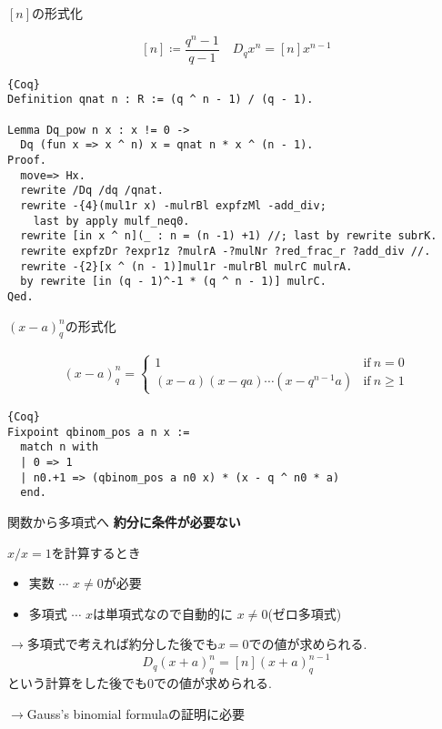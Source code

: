 \documentclass[dvipdfmx,cjk]{beamer}
\theoremstyle{mystyle}
\newcommand{\0}{\textbf{0}}
\begin{document}
\begin{frame}[fragile]{$[n]$の形式化}
	\begin{screen}
		\[
			[n] \coloneqq \frac{q^n - 1}{q - 1} \quad D_q x^n = [n] x^{n - 1}
		\]
	\end{screen}
	\begin{lstlisting}{Coq}
Definition qnat n : R := (q ^ n - 1) / (q - 1).

Lemma Dq_pow n x : x != 0 ->
  Dq (fun x => x ^ n) x = qnat n * x ^ (n - 1).
Proof.
  move=> Hx.
  rewrite /Dq /dq /qnat.
  rewrite -{4}(mul1r x) -mulrBl expfzMl -add_div;
    last by apply mulf_neq0.
  rewrite [in x ^ n](_ : n = (n -1) +1) //; last by rewrite subrK.
  rewrite expfzDr ?expr1z ?mulrA -?mulNr ?red_frac_r ?add_div //.
  rewrite -{2}[x ^ (n - 1)]mul1r -mulrBl mulrC mulrA.
  by rewrite [in (q - 1)^-1 * (q ^ n - 1)] mulrC.
Qed. \end{lstlisting}
\end{frame}

\begin{frame}[fragile]{$(x - a)^n_q$の形式化}
	\begin{screen}
		\begin{align*}
			(x - a)^n_q = \begin{cases}
	                      1 & \text{if}\ n = 0 \\
	                      (x - a) (x - qa) \cdots (x - q^{n - 1} a) & \text{if}\ n \ge 1
	                    \end{cases}
		\end{align*}
	\end{screen}
	\begin{lstlisting}{Coq}
Fixpoint qbinom_pos a n x :=
  match n with
  | 0 => 1
  | n0.+1 => (qbinom_pos a n0 x) * (x - q ^ n0 * a)
  end. \end{lstlisting}
\end{frame}

%

\begin{frame}{関数から多項式へ}
	\textbf{約分に条件が必要ない}
	
	$x / x = 1$を計算するとき
	\begin{itemize}
		\item 実数 $\cdots$ $x \ne 0$が必要
		\item 多項式 $\cdots$ $x$は単項式なので自動的に $x \ne 0$(ゼロ多項式)
	\end{itemize}
	$\to$多項式で考えれば約分した後でも$x = 0$での値が求められる. 
	\[
	  D_q (x + a)^n_q = [n](x + a)^{n - 1}_q
	\]
	という計算をした後でも$0$での値が求められる. 
	
	$\to$Gauss's binomial formulaの証明に必要
\end{frame}
\end{document}
